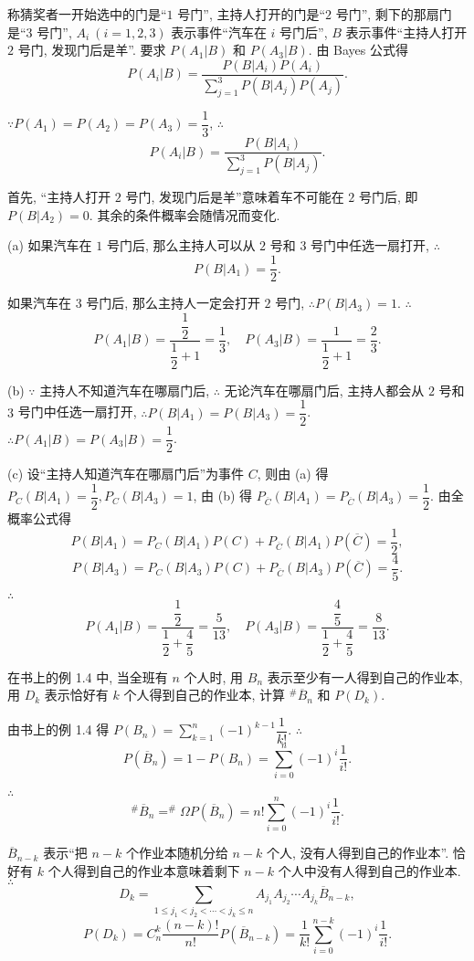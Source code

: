 \documentclass[color=black,device=normal,lang=cn]{elegantnote}
\numberwithin{equation}{section}
\theoremstyle{plain}
\numberwithin{exercise}{exsection}
\begin{document}
\begin{solution}
    称猜奖者一开始选中的门是``$1$ 号门'', 主持人打开的门是``$2$ 号门'', 剩下的那扇门是``$3$ 号门'', $A_i\ (i=1,2,3)$ 表示事件``汽车在 $i$ 号门后'', $B$ 表示事件``主持人打开 $2$ 号门, 发现门后是羊''. 要求 $P(A_1|B)$ 和 $P(A_3|B)$. 由 Bayes 公式得
    \[P(A_i|B)=\dfrac{P(B|A_i)P(A_i)}{\sum\limits_{j=1}^3P(B|A_j)P(A_j)}.\]

    $\because P(A_1)=P(A_2)=P(A_3)=\dfrac{1}{3}$, $\therefore$
    \[P(A_i|B)=\dfrac{P(B|A_i)}{\sum\limits_{j=1}^3P(B|A_j)}.\]

    首先, ``主持人打开 $2$ 号门, 发现门后是羊''意味着车不可能在 $2$ 号门后, 即 $P(B|A_2)=0$. 其余的条件概率会随情况而变化.

    (a) 如果汽车在 $1$ 号门后, 那么主持人可以从 $2$ 号和 $3$ 号门中任选一扇打开, $\therefore$
    \[P(B|A_1)=\dfrac{1}{2}.\]

    如果汽车在 $3$ 号门后, 那么主持人一定会打开 $2$ 号门, $\therefore P(B|A_3)=1$. $\therefore$
    \[P(A_1|B)=\dfrac{\dfrac{1}{2}}{\dfrac{1}{2}+1}=\dfrac{1}{3},\quad P(A_3|B)=\dfrac{1}{\dfrac{1}{2}+1}=\dfrac{2}{3}.\]

    (b) $\because$ 主持人不知道汽车在哪扇门后, $\therefore$ 无论汽车在哪扇门后, 主持人都会从 $2$ 号和 $3$ 号门中任选一扇打开, $\therefore P(B|A_1)=P(B|A_3)=\dfrac{1}{2}$. $\therefore P(A_1|B)=P(A_3|B)=\dfrac{1}{2}$.

    (c) 设``主持人知道汽车在哪扇门后''为事件 $C$, 则由 (a) 得 $P_C(B|A_1)=\dfrac{1}{2},P_C(B|A_3)=1$, 由 (b) 得 $P_{\overline{C}}(B|A_1)=P_{\overline{C}}(B|A_3)=\dfrac{1}{2}$. 由全概率公式得
    \[P(B|A_1)=P_C(B|A_1)P(C)+P_{\overline{C}}(B|A_1)P(\overline{C})=\dfrac{1}{2},\]
    \[P(B|A_3)=P_C(B|A_3)P(C)+P_{\overline{C}}(B|A_3)P(\overline{C})=\dfrac{4}{5}.\]

    $\therefore$
    \[P(A_1|B)=\dfrac{\dfrac{1}{2}}{\dfrac{1}{2}+\dfrac{4}{5}}=\dfrac{5}{13},\quad P(A_3|B)=\dfrac{\dfrac{4}{5}}{\dfrac{1}{2}+\dfrac{4}{5}}=\dfrac{8}{13}.\]
\end{solution}
\begin{exercise}
    在书上的例 1.4 中, 当全班有 $n$ 个人时, 用 $B_n$ 表示至少有一人得到自己的作业本, 用 $D_k$ 表示恰好有 $k$ 个人得到自己的作业本, 计算 $^\#\overline{B}_n$ 和 $P(D_k)$.
\end{exercise}
\begin{solution}
    由书上的例 1.4 得 $P(B_n)=\sum\limits_{k=1}^n(-1)^{k-1}\dfrac{1}{k!}$. $\therefore$
    \[P(\overline{B}_n)=1-P(B_n)=\sum\limits_{i=0}^n(-1)^{i}\dfrac{1}{i!}.\]

    $\therefore$
    \[^\#\overline{B}_n=^\#\Omega P(\overline{B}_n)=n!\sum\limits_{i=0}^n(-1)^{i}\dfrac{1}{i!}.\]
    
    $\overline{B}_{n-k}$ 表示``把 $n-k$ 个作业本随机分给 $n-k$ 个人, 没有人得到自己的作业本''. 恰好有 $k$ 个人得到自己的作业本意味着剩下 $n-k$ 个人中没有人得到自己的作业本. $\therefore$
    \[D_k=\sum\limits_{1\leq j_1<j_2<\cdots<j_k\leq n}A_{j_1}A_{j_2}\cdots A_{j_k}\overline{B}_{n-k},\]
    \[P(D_k)=C_n^k\dfrac{(n-k)!}{n!}P(\overline{B}_{n-k})=\dfrac{1}{k!}\sum\limits_{i=0}^{n-k}(-1)^{i}\dfrac{1}{i!}.\]
\end{solution}
\end{document}
